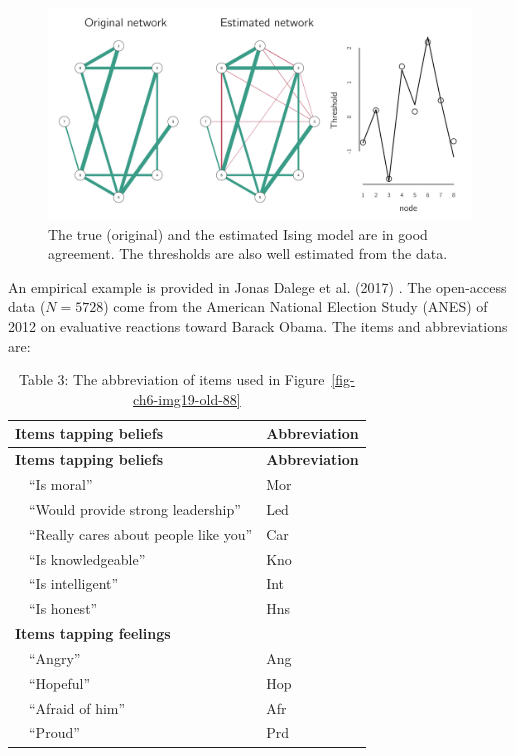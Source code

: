 \documentclass[
  a4paper,
  DIV=11,
  numbers=noendperiod,
  oneside]{scrreprt}
\begin{document}
\begin{figure}

{\centering \includegraphics{media/ch6/fig-ch6-img18-old-87.png}

}

\caption{\label{fig-ch6-img18-old-87}The true (original) and the
estimated Ising model are in good agreement. The thresholds are also
well estimated from the data.}

\end{figure}

An empirical example is provided in Jonas Dalege et al. (2017) . The
open-access data (\(N = 5728\)) come from the American National Election
Study (ANES) of 2012 on evaluative reactions toward Barack Obama. The
items and abbreviations are:

\begin{longtable}[]{@{}ll@{}}
\caption{Table 3: The abbreviation of items used in
Figure~\ref{fig-ch6-img19-old-88}}\tabularnewline
\toprule\noalign{}
\textbf{Items tapping beliefs} & \textbf{Abbreviation} \\
\midrule\noalign{}
\endfirsthead
\toprule\noalign{}
\textbf{Items tapping beliefs} & \textbf{Abbreviation} \\
\midrule\noalign{}
\endhead
\bottomrule\noalign{}
\endlastfoot
 ``Is moral'' & Mor \\
 ``Would provide strong leadership'' & Led \\
 ``Really cares about people like you'' & Car \\
 ``Is knowledgeable'' & Kno \\
 ``Is intelligent'' & Int \\
 ``Is honest'' & Hns \\
\textbf{Items tapping feelings} & \\
 ``Angry'' & Ang \\
 ``Hopeful'' & Hop \\
 ``Afraid of him'' & Afr \\
 ``Proud'' & Prd \\
\end{longtable}
\end{document}
